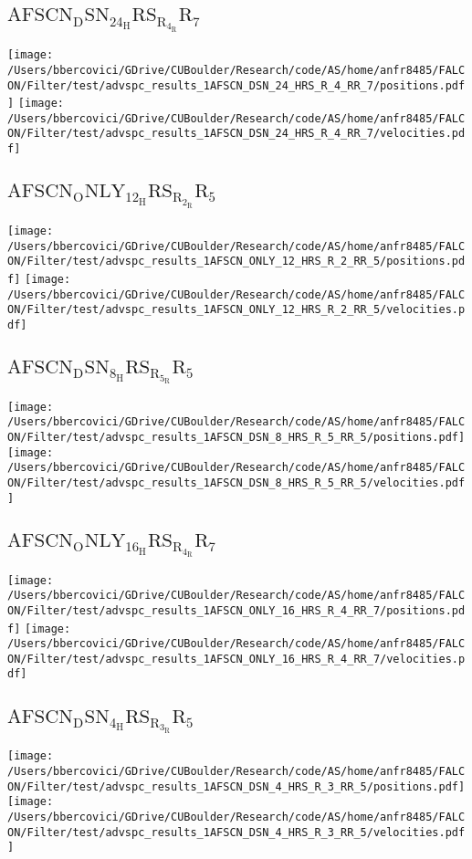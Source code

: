 \subsection{$\mathrm{AFSCN_DSN_24_HRS_R_4_RR_7}$}
\texttt{[image: /Users/bbercovici/GDrive/CUBoulder/Research/code/AS/home/anfr8485/FALCON/Filter/test/advspc\_results\_1AFSCN\_DSN\_24\_HRS\_R\_4\_RR\_7/positions.pdf]}
\texttt{[image: /Users/bbercovici/GDrive/CUBoulder/Research/code/AS/home/anfr8485/FALCON/Filter/test/advspc\_results\_1AFSCN\_DSN\_24\_HRS\_R\_4\_RR\_7/velocities.pdf]}
\subsection{$\mathrm{AFSCN_ONLY_12_HRS_R_2_RR_5}$}
\texttt{[image: /Users/bbercovici/GDrive/CUBoulder/Research/code/AS/home/anfr8485/FALCON/Filter/test/advspc\_results\_1AFSCN\_ONLY\_12\_HRS\_R\_2\_RR\_5/positions.pdf]}
\texttt{[image: /Users/bbercovici/GDrive/CUBoulder/Research/code/AS/home/anfr8485/FALCON/Filter/test/advspc\_results\_1AFSCN\_ONLY\_12\_HRS\_R\_2\_RR\_5/velocities.pdf]}
\subsection{$\mathrm{AFSCN_DSN_8_HRS_R_5_RR_5}$}
\texttt{[image: /Users/bbercovici/GDrive/CUBoulder/Research/code/AS/home/anfr8485/FALCON/Filter/test/advspc\_results\_1AFSCN\_DSN\_8\_HRS\_R\_5\_RR\_5/positions.pdf]}
\texttt{[image: /Users/bbercovici/GDrive/CUBoulder/Research/code/AS/home/anfr8485/FALCON/Filter/test/advspc\_results\_1AFSCN\_DSN\_8\_HRS\_R\_5\_RR\_5/velocities.pdf]}
\subsection{$\mathrm{AFSCN_ONLY_16_HRS_R_4_RR_7}$}
\texttt{[image: /Users/bbercovici/GDrive/CUBoulder/Research/code/AS/home/anfr8485/FALCON/Filter/test/advspc\_results\_1AFSCN\_ONLY\_16\_HRS\_R\_4\_RR\_7/positions.pdf]}
\texttt{[image: /Users/bbercovici/GDrive/CUBoulder/Research/code/AS/home/anfr8485/FALCON/Filter/test/advspc\_results\_1AFSCN\_ONLY\_16\_HRS\_R\_4\_RR\_7/velocities.pdf]}
\subsection{$\mathrm{AFSCN_DSN_4_HRS_R_3_RR_5}$}
\texttt{[image: /Users/bbercovici/GDrive/CUBoulder/Research/code/AS/home/anfr8485/FALCON/Filter/test/advspc\_results\_1AFSCN\_DSN\_4\_HRS\_R\_3\_RR\_5/positions.pdf]}
\texttt{[image: /Users/bbercovici/GDrive/CUBoulder/Research/code/AS/home/anfr8485/FALCON/Filter/test/advspc\_results\_1AFSCN\_DSN\_4\_HRS\_R\_3\_RR\_5/velocities.pdf]}
